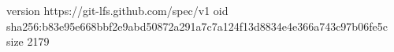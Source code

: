version https://git-lfs.github.com/spec/v1
oid sha256:b83e95e668bbf2e9abd50872a291a7c7a124f13d8834e4e366a743c97b06fe5c
size 2179
